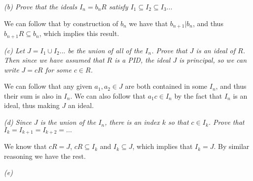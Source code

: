 \documentclass[11pt,oneside,titlepage]{book}
\begin{document}
\textit{(b) Prove that the ideals $I_n = b_nR$ satisfy $I_1 \subseteq
  I_2 \subseteq I_3 ... $}

We can follow that by construction of $b_n$ we have that $b_{n + 1} | b_n$,
and thus $b_{n + 1}R \subseteq  b_n$, which implies this result.

\textit{(c) Let $J = I_1 \cup I_2 ...$ be the union of all of the
  $I_n$. Prove that $J$ is an ideal of $R$. Then since we have assumed that
  $R$ is a PID, the ideal $J$ is principal, so we can write $J = cR$
  for some $c \in R$.}

We can follow that any given $a_1, a_2 \in J$ are both contained in
some $I_n$, and thus their sum is also in $I_n$. We can also
follow that $a_1 c \in I_n$ by the fact that $I_n$ is an ideal,
thus making $J$ an ideal.

\textit{(d) Since $J$ is the union of the $I_n$, there is an index $k$
  so that $c \in I_k$. Prove that $I_k = I_{k + 1} = I_{k + 2} = ...$}

We know that $cR = J$, $cR \subseteq I_k$ and $I_k \subseteq J$,
which implies that $I_k = J$. By similar reasoning we have the rest.

\textit{(e) }
\end{document}
